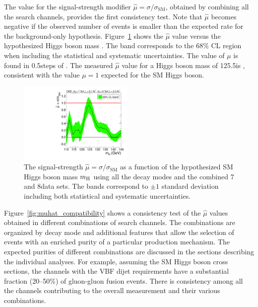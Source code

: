 \documentclass[12pt,twoside,a4paper,cmspaper,final,collab]{cms-tdr}
\begin{document}
The value for the signal-strength modifier $\hat \mu = \sigma / \sigma_{\mathrm{SM}}$,
obtained by combining  all the search channels,
provides the first consistency test.
Note that $\hat \mu$ becomes negative if the observed number of events is
smaller than the expected rate for the background-only hypothesis.
Figure~\ref{fig:muhat} shows
the $\hat \mu$ value versus the hypothesized
Higgs boson mass \mH. The band corresponds to the 68\% CL region when including the statistical and
systematic  uncertainties.
The value of $\mu$ is found in 0.5\GeV steps of \mH. The measured $\hat \mu$ value
for a Higgs boson mass of 125.5\GeV is  \MUHAT,
consistent with the value $\mu=1$ expected for the SM Higgs boson.

\begin{figure} [htbp]
\centering
\includegraphics[width=0.49\textwidth]{figures/comb/sqr_mlz_comb_HPA_smallGGScale_1}
\caption{
	The signal-strength $\hat \mu = \sigma / \sigma_\mathrm{SM}$
	as a function of the hypothesized
        SM Higgs boson mass $m_{\mathrm{H}}$ using all the decay modes and the combined 7 and 8\TeV data sets.
	The bands correspond to ${\pm}1$ standard deviation including both statistical and systematic uncertainties.
    }
\label{fig:muhat}
\end{figure}

Figure~\ref{fig:muhat_compatibility} shows a consistency test of
the $\hat \mu$ values obtained in different combinations of search channels.
The combinations are organized by decay mode and additional features that
allow the selection of events with an enriched purity of a particular production mechanism.
The expected purities of different combinations
are discussed in the sections describing the individual analyses.
For example, assuming the SM Higgs boson cross sections,
the channels with the VBF dijet requirements have a substantial fraction (20--50\%)
of gluon-gluon fusion events. There is consistency
among all the channels contributing to the overall measurement and their various combinations.
\end{document}
